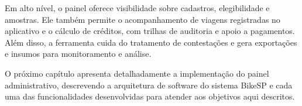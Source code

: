 Em alto nível, o painel oferece visibilidade sobre cadastros, elegibilidade e amostras. Ele também permite o acompanhamento de viagens registradas no aplicativo e o cálculo de créditos, com trilhas de auditoria e apoio a pagamentos. Além disso, a ferramenta cuida do tratamento de contestações e gera exportações e insumos para monitoramento e análise.

O próximo capítulo apresenta detalhadamente a implementação do painel administrativo, descrevendo a arquitetura de software do sistema BikeSP e cada uma das funcionalidades desenvolvidas para atender aos objetivos aqui descritos.


